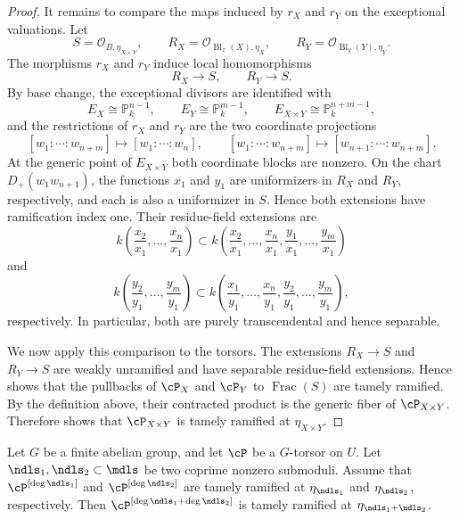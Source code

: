 \begin{proof}
It remains to compare the maps induced by $r_X$ and $r_Y$ on the exceptional
valuations. Let
\[
S=\mathcal O_{B,\eta_{X\times Y}},\qquad
R_X=\mathcal O_{\operatorname{Bl}_x(X),\eta_X},\qquad
R_Y=\mathcal O_{\operatorname{Bl}_y(Y),\eta_Y}.
\]
The morphisms $r_X$ and $r_Y$ induce local homomorphisms
\[
    R_X\longrightarrow S,
    \qquad
    R_Y\longrightarrow S.
\]
By base change, the exceptional divisors are identified with
\[
    E_X\cong\mathbb P_k^{n-1},\qquad
    E_Y\cong\mathbb P_k^{m-1},\qquad
    E_{X\times Y}\cong\mathbb P_k^{n+m-1},
\]
and the restrictions of $r_X$ and $r_Y$ are the two coordinate projections
\[
[w_1:\cdots:w_{n+m}]\longmapsto[w_1:\cdots:w_n],
\qquad
[w_1:\cdots:w_{n+m}]\longmapsto[w_{n+1}:\cdots:w_{n+m}].
\]
At the generic point of $E_{X\times Y}$ both coordinate blocks are nonzero.
On the chart $D_+(w_1w_{n+1})$, the functions $x_1$ and $y_1$ are
uniformizers in $R_X$ and $R_Y$, respectively, and each is also a
uniformizer in $S$. Hence both extensions have ramification index one. Their
residue-field extensions are
\[
k\left(\frac{x_2}{x_1},\ldots,\frac{x_n}{x_1}\right)
\subset
k\left(\frac{x_2}{x_1},\ldots,\frac{x_n}{x_1},
        \frac{y_1}{x_1},\ldots,\frac{y_m}{x_1}\right)
\]
and
\[
k\left(\frac{y_2}{y_1},\ldots,\frac{y_m}{y_1}\right)
\subset
k\left(\frac{x_1}{y_1},\ldots,\frac{x_n}{y_1},
        \frac{y_2}{y_1},\ldots,\frac{y_m}{y_1}\right),
\]
respectively. In particular, both are purely transcendental and hence
separable.

We now apply this comparison to the torsors. The extensions
$R_X\to S$ and $R_Y\to S$ are weakly unramified and have
separable residue-field extensions. Hence
 shows that the pullbacks of
$\cP_X$ and $\cP_Y$ to $\operatorname{Frac}(S)$ are tamely ramified.
By the definition above, their contracted product is the generic fiber of
$\cP_{X\times Y}$. Therefore
 shows that
$\cP_{X\times Y}$ is tamely ramified at $\eta_{X\times Y}$.
\end{proof}

\begin{cor}\label{cor:moduli-reduction}
Let $G$ be a finite abelian group, and let $\cP$ be a $G$-torsor on $U$.
Let $\ndls_1,\ndls_2\subset\mdls$ be two coprime nonzero submoduli.
Assume that $\cP^{[\deg\ndls_1]}$ and $\cP^{[\deg\ndls_2]}$ are tamely
ramified at $\eta_{\ndls_1}$ and $\eta_{\ndls_2}$, respectively. Then
$\cP^{[\deg\ndls_1+\deg\ndls_2]}$ is tamely ramified at
$\eta_{\ndls_1+\ndls_2}$.
\end{cor}

